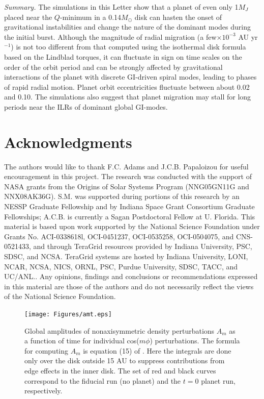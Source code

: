 \documentclass[12pt,manuscript,authoryear]{aastex}
\begin{document}
{\it Summary.} The simulations in this Letter show that a planet of even only 1$M_J$ placed near the $Q$-minimum in a 0.14$M_{\odot}$ disk can hasten the onset of gravitational instabilities and change the nature of the dominant modes during the initial burst. Although the magnitude of radial migration (a few$\times10^{-3}$ AU yr$^{-1}$) is not too different from that computed using the \citet{tanaka2002}  isothermal disk formula based on the Lindblad torques, it can fluctuate in sign on time scales on the order of the orbit period and can be strongly affected by gravitational interactions of the planet with discrete GI-driven spiral modes, leading to phases of rapid radial motion. Planet orbit eccentricities fluctuate between about 0.02 and 0.10. The simulations also suggest that planet migration may stall for long periods near the ILRs of dominant global GI-modes.

\section{Acknowledgments}

The authors would like to thank F.C. Adams and J.C.B. Papaloizou for useful encouragement in this project. The research was conducted with the support of NASA grants from the Origins of Solar Systems  Program (NNG05GN11G and NNX08AK36G). S.M. was supported during portions of this research by an NESSP Graduate Fellowship and by Indiana Space Grant Consortium Graduate Fellowships; A.C.B. is currently a Sagan Postdoctoral Fellow at U. Florida. This material is based upon work supported by the National Science Foundation under Grants No. ACI-0338618l, OCI-0451237, OCI-0535258, OCI-0504075, and CNS-0521433, and through TeraGrid resources provided by Indiana University, PSC, SDSC, and NCSA. TeraGrid systems are hosted by Indiana University, LONI, NCAR, NCSA, NICS, ORNL, PSC, Purdue University, SDSC, TACC, and UC/ANL.. Any opinions, findings and conclusions or recommendations expressed in this material are those of the authors and do not necessarily reflect the views of the National Science Foundation. 




\newpage


\begin{figure}[t]
\center
\texttt{[image: Figures/amt.eps]}
\caption{Global amplitudes of nonaxisymmetric density perturbations $A_m$ as a function of time for individual cos($m\phi$) perturbations. The formula for computing $A_m$ is equation (15) of \citep{boley2006}. Here the integrals are done only over the disk outside 15 AU to suppress contributions from edge effects in the inner disk. The set of red and black curves correspond to the fiducial run (no planet) and the $t = 0$ planet run, respectively.}
\label{fig:Am}
\end{figure}
\end{document}
